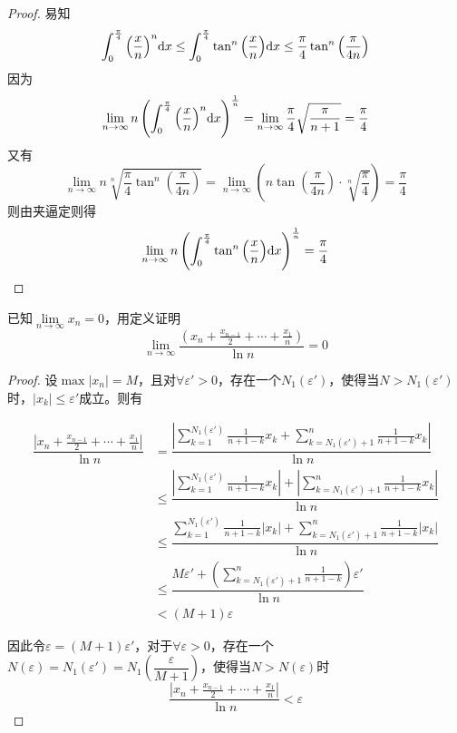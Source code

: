 \begin{proof}

    易知
    $$\int_{0}^{\frac{\pi}{4}}{\left(\dfrac{x}{n}\right)^n}\mathrm{d} x \leq \int_{0}^{\frac{\pi}{4}}{\tan^n{\left(\dfrac{x}{n}\right)}}\mathrm{d} x \leq \dfrac{\pi}{4} \tan^n{\left(\dfrac{\pi}{4n}\right)}$$
    因为
    $$\lim\limits_{n\to\infty}{n \left( \int_{0}^{\frac{\pi}{4}}{\left(\dfrac{x}{n}\right)^n}\mathrm{d} x \right)^{\frac{1}{n}}} = \lim\limits_{n\to\infty}{\dfrac{\pi}{4}\sqrt{\dfrac{\pi}{n + 1}}} = \dfrac{\pi}{4}$$
    又有
    $$\lim\limits_{n\to\infty}{n \sqrt[n]{\dfrac{\pi}{4}\tan^n{\left( \dfrac{\pi}{4n} \right)}}} = \lim\limits_{n\to\infty}{\left(n \tan{\left(\dfrac{\pi}{4n}\right)} \cdot \sqrt[n]{\dfrac{\pi}{4}}\right)} = \dfrac{\pi}{4}$$
    则由夹逼定则得
    $$\lim\limits_{n\to\infty}{n\left(\int_{0}^{\frac{\pi}{4}}{\tan^n{\left(\dfrac{x}{n}\right)}}\mathrm{d} x\right)^{\frac{1}{n}}} = \dfrac{\pi}{4}$$

\end{proof}

\begin{proposition}

    已知$\lim\limits_{n\to\infty}{x_n} = 0$，用定义证明
    $$\lim\limits_{n\to\infty}{\dfrac{\left(x_n + \frac{x_{n - 1}}{2} + \cdots + \frac{x_1}{n}\right)}{\ln n}} = 0$$

\end{proposition}

\begin{proof}

    设$\max|x_n| = M$，且对$\forall \varepsilon ' > 0$，存在一个$N_1(\varepsilon ')$，使得当$N > N_1(\varepsilon ')$时，$|x_k| \leq \varepsilon '$成立。则有
    
    \begin{align*}
        \dfrac{\left|x_n + \frac{x_{n - 1}}{2} + \cdots + \frac{x_1}{n}\right|}{\ln n} & = \dfrac{\left| \sum\limits_{k = 1}^{N_1(\varepsilon ')}{\frac{1}{n + 1 - k}x_k} + \sum\limits_{k = N_1(\varepsilon ') + 1}^{n}{\frac{1}{n + 1 - k}x_k}\right|}{\ln n} \\
        & \leq \dfrac{\left| \sum\limits_{k = 1}^{N_1(\varepsilon ')}{\frac{1}{n + 1 - k}x_k} \right| + \left| \sum\limits_{k = N_1(\varepsilon ') + 1}^{n}{\frac{1}{n + 1 - k}x_k}\right|}{\ln n} \\
        & \leq \dfrac{ \sum\limits_{k = 1}^{N_1(\varepsilon ')}{\frac{1}{n + 1 - k}\left| x_k \right|} + \sum\limits_{k = N_1(\varepsilon ') + 1}^{n}{\frac{1}{n + 1 - k} \left| x_k \right|}}{\ln n} \\
        & \leq \dfrac{M \varepsilon ' + \left( \sum\limits_{k = N_1(\varepsilon ') + 1}^{n}{\frac{1}{n + 1 - k}} \right)\varepsilon '}{\ln n} \\
        & < (M + 1) \varepsilon
    \end{align*}

    因此令$\varepsilon = (M + 1)\varepsilon '$，对于$\forall \varepsilon >  0$，存在一个$N(\varepsilon) = N_1(\varepsilon') = N_1(\dfrac{\varepsilon}{M + 1})$，使得当$N > N(\varepsilon)$时
    $$\dfrac{\left|x_n + \frac{x_{n - 1}}{2} + \cdots + \frac{x_1}{n}\right|}{\ln n} < \varepsilon$$

\end{proof}

